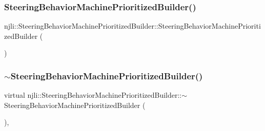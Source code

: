 \subsubsection{\texorpdfstring{Steering\+Behavior\+Machine\+Prioritized\+Builder()}{SteeringBehaviorMachinePrioritizedBuilder()}\hspace{0.1cm}{\footnotesize\ttfamily [2/2]}}
{\footnotesize\ttfamily njli\+::\+Steering\+Behavior\+Machine\+Prioritized\+Builder\+::\+Steering\+Behavior\+Machine\+Prioritized\+Builder (\begin{DoxyParamCaption}\item[{const \mbox{\hyperlink{classnjli_1_1_steering_behavior_machine_prioritized_builder}{Steering\+Behavior\+Machine\+Prioritized\+Builder}} \&}]{ }\end{DoxyParamCaption})\hspace{0.3cm}{\ttfamily [protected]}}

\mbox{\label{classnjli_1_1_steering_behavior_machine_prioritized_builder_a68402a48edc8abe30c17b83342ad2963}} 
\subsubsection{\texorpdfstring{$\sim$\+Steering\+Behavior\+Machine\+Prioritized\+Builder()}{~SteeringBehaviorMachinePrioritizedBuilder()}}
{\footnotesize\ttfamily virtual njli\+::\+Steering\+Behavior\+Machine\+Prioritized\+Builder\+::$\sim$\+Steering\+Behavior\+Machine\+Prioritized\+Builder (\begin{DoxyParamCaption}{ }\end{DoxyParamCaption})\hspace{0.3cm}{\ttfamily [protected]}, {\ttfamily [virtual]}}



